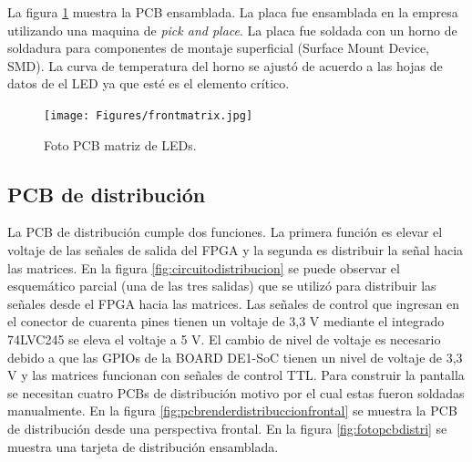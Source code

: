 La figura \ref{fig:fotomatrixled} muestra la PCB ensamblada. La placa fue ensamblada en la empresa utilizando una maquina de \textit{pick and place}. La placa fue soldada con un horno de soldadura para componentes de montaje superficial (Surface Mount Device, SMD). La curva de temperatura del horno se ajustó de acuerdo a las hojas de datos de el LED ya que esté es el elemento crítico.

\begin{figure}[htpb]
	\centering
    \texttt{[image: Figures/frontmatrix.jpg]} 
	\caption{Foto PCB matriz de LEDs.}
	\label{fig:fotomatrixled}
\end{figure}
\pagebreak


\subsection{PCB de distribución}
La PCB de distribución cumple dos funciones. La primera función es elevar el voltaje de las señales de salida del FPGA y la segunda es distribuir la señal hacia las matrices. En la figura \ref{fig:circuitodistribucion} se puede observar el esquemático parcial (una de las tres salidas) que se utilizó para distribuir las señales desde el FPGA hacia las matrices. 
Las señales de control que ingresan en el conector de cuarenta pines tienen un voltaje de 3,3 V mediante el integrado 74LVC245 se eleva el voltaje a 5 V. El cambio de nivel de voltaje es necesario debido a que las GPIOs de la BOARD DE1-SoC tienen un nivel de voltaje de 3,3 V y las matrices funcionan con señales de control TTL. Para construir la pantalla se necesitan cuatro PCBs de distribución motivo por el cual estas fueron soldadas manualmente. En la figura \ref{fig:pcbrenderdistribuccionfrontal}  se muestra la PCB de distribución desde una perspectiva frontal. En la figura \ref{fig:fotopcbdistri} se muestra una tarjeta de distribución ensamblada. 

